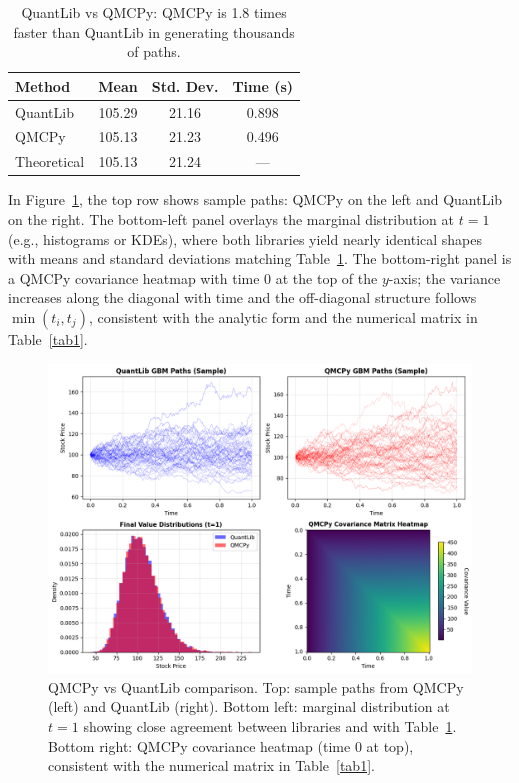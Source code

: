 \documentclass{article}
\begin{document}
\begin{table}[btp]
\centering
\caption{QuantLib vs QMCPy: QMCPy is 1.8 times faster than QuantLib in generating thousands of paths.}
\begin{tabular}{lccc}
\toprule
\textbf{Method} & \textbf{Mean} & \textbf{Std. Dev.} & \textbf{Time (s)}   \\
\midrule
QuantLib & 105.29 & 21.16 & 0.898  \\
QMCPy & 105.13 & 21.23 & 0.496  \\
Theoretical & 105.13 & 21.24 & ---  \\
\bottomrule
\end{tabular}
\label{tab2}
\end{table}

 In Figure~\ref{fig:qmcpy_quantlib_comparison}, the top row shows sample paths: QMCPy on the left and QuantLib on the right. The bottom-left panel overlays the marginal distribution at $t=1$ (e.g., histograms or KDEs), where both libraries yield nearly identical shapes with means and standard deviations matching Table~\ref{tab2}. The bottom-right panel is a QMCPy covariance heatmap with time 0 at the top of the $y$-axis; the variance increases along the diagonal with time and the off-diagonal structure follows $\min(t_i,t_j)$, consistent with the analytic form and the numerical matrix in Table~\ref{tab1}.

\begin{figure}[h]
\centering
\includegraphics[width=1\textwidth]{images/figure_5.png}
\caption{QMCPy vs QuantLib comparison. Top: sample paths from QMCPy (left) and QuantLib (right). Bottom left: marginal distribution at $t=1$ showing close agreement between libraries and with Table~\ref{tab2}. Bottom right: QMCPy covariance heatmap (time 0 at top), consistent with the numerical matrix in Table~\ref{tab1}.}
\label{fig:qmcpy_quantlib_comparison}
\end{figure}
\end{document}

